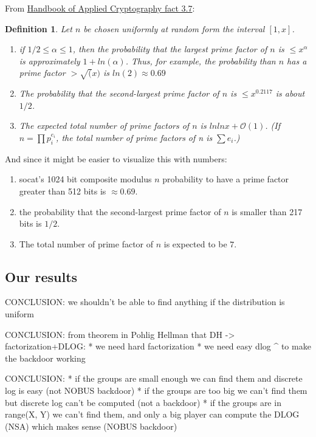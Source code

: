 \documentclass[a4paper,11pt]{article}
\newtheorem{definition}{Definition}
\begin{document}
From \href{http://cacr.uwaterloo.ca/hac/about/chap3.pdf}{Handbook of Applied Cryptography fact 3.7}:

\begin{definition}
    Let $n$ be chosen uniformly at random form the interval $[1, x]$.
    \begin{enumerate}
        \item if $1/2 \leq \alpha \leq 1$, then the probability that the largest prime factor of $n$ is $\leq x^{\alpha}$ is approximately $1+ ln(\alpha)$. Thus, for example, the probability than $n$ has a prime factor $> \sqrt(x)$ is $ln(2) \approx 0.69$
        \item The probability that the second-largest prime factor of $n$ is $\leq x^{0.2117}$ is about $1/2$. 
        \item The expected total number of prime factors of $n$ is $ln ln x + \mathcal{O}(1)$. (If $n = \prod p_i^{e_i}$, the total number of prime factors of n is $\sum e_i$.)
    \end{enumerate} 
\end{definition}

And since it might be easier to visualize this with numbers:

\begin{enumerate}
    \item socat's 1024 bit composite modulus $n$ probability to have a prime factor greater than 512 bits is $\approx 0.69$.
    \item the probability that the second-largest prime factor of $n$ is smaller than 217 bits is $1/2$.
    \item The total number of prime factor of $n$ is expected to be $7$.
\end{enumerate}


\subsection{Our results}

CONCLUSION: we shouldn't be able to find anything if the distribution is uniform

CONCLUSION: from theorem in Pohlig Hellman that DH -> factorization+DLOG:
* we need hard factorization
* we need easy dlog
^ to make the backdoor working

CONCLUSION: 
* if the groups are small enough we can find them and discrete log is easy (not  NOBUS backdoor)
* if the groups are too big we can't find them but discrete log can't be computed (not a backdoor)
* if the groups are in range(X, Y) we can't find them, and only a big player can compute the DLOG (NSA) which makes sense (NOBUS backdoor)
\end{document}
